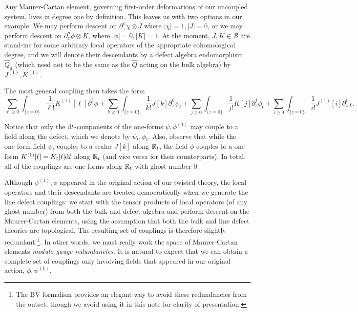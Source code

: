 \documentclass[11pt]{amsart}
\begin{document}
Any Maurer-Cartan element, governing first-order deformations of our uncoupled system, lives in degree one by definition. This leaves us with two options in our example. We may perform descent on $\partial_z^n \chi \otimes J$ where $|\chi| = 1, |J|=0$, or we may perform descent on $\partial_z^n \phi \otimes K$, where $|\phi|=0, |K| = 1$.  At the moment, $J, K \in \mathcal{B}$ are stand-ins for some arbitrary local operators of the appropriate cohomological degree, and we will denote their descendants by a defect algebra endomorphism $\hat{Q}_{d}$ (which need not to be the same as the $\hat{Q}$ acting on the bulk algebra) by $J^{(1)}, K^{(1)}$. 


The most general coupling then takes the form
\[
\sum_{\ell \geq 0} \int_{\{z=0\}} \frac{1}{\ell!} K^{(1)} [\ell] \partial_z^\ell \phi + \sum_{k \geq 0} \int_{\{z=0\}} \frac{1}{k!} J[k] \partial_z^k \psi_t  + \sum_{j \geq 0} \int_{\{z=0\}} \frac{1}{j!} K[j] \partial_z^j \phi_t +  \sum_{i \geq 0} \int_{\{z=0\}} \frac{1}{i!} J^{(1)}[i] \partial_z^i \chi.
\] 


Notice that only the ${\rm d} t$-components of the one-forms $\psi, \phi^{(1)}$ may couple to a field along the defect, which we denote by $\psi_t, \phi_t$. 
Also, observe that while the one-form field $\psi_t$ couples to a scalar $J[k]$ along $\mathbb R_t$, the field $\phi$ couples to a one-form $K^{(1)}[\ell] = K_t [\ell] {\rm d} t$ along $\mathbb R_t$ (and vice versa for their counterparts). In total, all of the couplings are one-forms along $\mathbb R_t$ with ghost number 0. 

Although $\psi^{(1)}, \phi$ appeared in the original action of our twisted theory, the local operators and their descendants are treated democratically when we generate the line defect couplings: we start with the tensor products of local operators (of any ghost number) from both the bulk and defect algebra and perform descent on the Maurer-Cartan elements, using the assumption that both the bulk and line defect theories are topological. The resulting set of couplings is therefore slightly redundant \footnote{The BV formalism provides an elegant way to avoid these redundancies from the outset, though we avoid using it in this note for clarity of presentation.}. In other words, we must really work the space of Maurer-Cartan elements \textit{modulo gauge redundancies}. It is natural to expect that we can obtain a complete set of couplings only involving fields that appeared in our original action, $\phi, \psi^{(1)}$.
\end{document}
